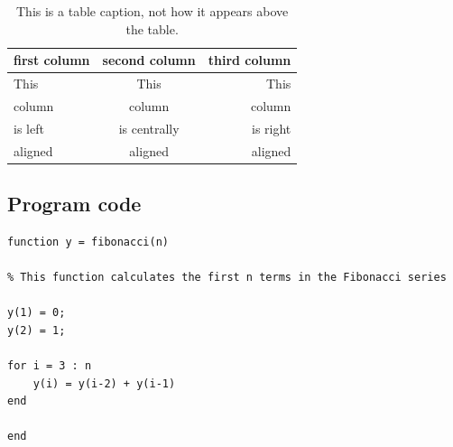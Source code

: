 \begin{table}[H]
    \caption{This is a table caption, not how it appears above the table.}
    \label{tab:table label} %
    \begin{center}
        \begin{tabular}{lcr} %
            \toprule %
            first column & second column & third column \\
            \midrule %
            This         & This          & This         \\
            column       & column        & column       \\
            is left      & is centrally  & is right     \\
            aligned      & aligned       & aligned      \\
            \bottomrule %
        \end{tabular}
    \end{center}
\end{table}

\subsection{Program code}

\begin{lstlisting}[style=matlabcode,
    caption = A MATLAB function to compute the first $n$ numbers of the Fibonacci series,
    label = mat:fibonacci
    ]
function y = fibonacci(n)

% This function calculates the first n terms in the Fibonacci series

y(1) = 0;
y(2) = 1;

for i = 3 : n
    y(i) = y(i-2) + y(i-1)
end

end
\end{lstlisting}

